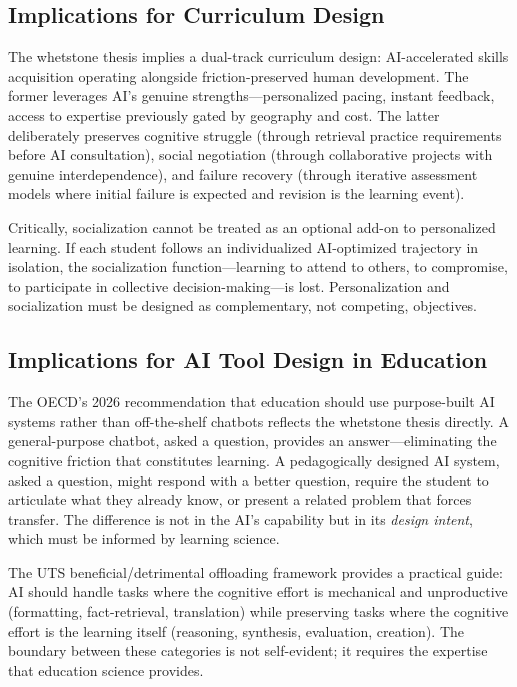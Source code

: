 \documentclass[12pt]{article}
\begin{document}
\subsection{Implications for Curriculum Design}
\label{sec:curriculum}

The whetstone thesis implies a dual-track curriculum design: AI-accelerated skills acquisition operating alongside friction-preserved human development. The former leverages AI's genuine strengths---personalized pacing, instant feedback, access to expertise previously gated by geography and cost. The latter deliberately preserves cognitive struggle (through retrieval practice requirements before AI consultation), social negotiation (through collaborative projects with genuine interdependence), and failure recovery (through iterative assessment models where initial failure is expected and revision is the learning event).

Critically, socialization cannot be treated as an optional add-on to personalized learning. If each student follows an individualized AI-optimized trajectory in isolation, the socialization function---learning to attend to others, to compromise, to participate in collective decision-making---is lost. Personalization and socialization must be designed as complementary, not competing, objectives.

\subsection{Implications for AI Tool Design in Education}
\label{sec:tool-design}

The OECD's 2026 recommendation that education should use purpose-built AI systems rather than off-the-shelf chatbots reflects the whetstone thesis directly. A general-purpose chatbot, asked a question, provides an answer---eliminating the cognitive friction that constitutes learning. A pedagogically designed AI system, asked a question, might respond with a better question, require the student to articulate what they already know, or present a related problem that forces transfer. The difference is not in the AI's capability but in its \emph{design intent}, which must be informed by learning science.

The UTS beneficial/detrimental offloading framework provides a practical guide: AI should handle tasks where the cognitive effort is mechanical and unproductive (formatting, fact-retrieval, translation) while preserving tasks where the cognitive effort is the learning itself (reasoning, synthesis, evaluation, creation). The boundary between these categories is not self-evident; it requires the expertise that education science provides.
\end{document}
